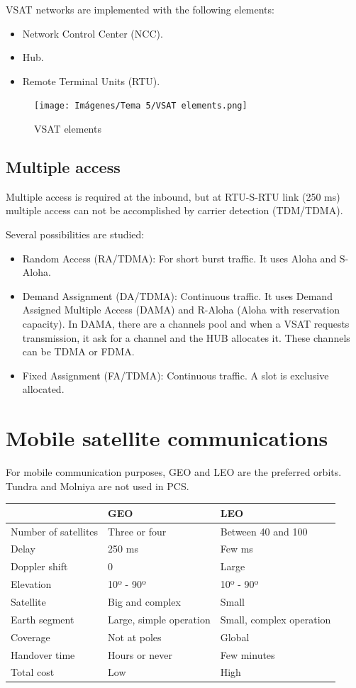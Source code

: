 \documentclass[
	12pt,
	twoside
]{book}
\begin{document}
VSAT networks are implemented with the following elements:
\begin{itemize}
	\item Network Control Center (NCC).
	\item Hub.
	\item Remote Terminal Units (RTU).
\end{itemize}

\begin{figure}[H]
	\centering
	\texttt{[image: Imágenes/Tema 5/VSAT elements.png]}
	\caption{
		\label{fig:unit5_VSAT}
		VSAT elements
	}
\end{figure}

\subsection{Multiple access}

Multiple access is required at the inbound, but at RTU-S-RTU link (250 ms) multiple access can not be accomplished by carrier detection (TDM/TDMA).

Several possibilities are studied:
\begin{itemize}
	\item Random Access (RA/TDMA): For short burst traffic. It uses Aloha and S-Aloha.
	\item Demand Assignment (DA/TDMA): Continuous traffic. It uses Demand Assigned Multiple Access (DAMA) and R-Aloha (Aloha with reservation capacity). In DAMA, there are a channels pool and when a VSAT requests transmission, it ask for a channel and the HUB allocates it. These channels can be TDMA or FDMA.
	\item Fixed Assignment (FA/TDMA): Continuous traffic. A slot is exclusive allocated.
\end{itemize}

\section{Mobile satellite communications}

For mobile communication purposes, GEO and LEO are the preferred orbits. Tundra and Molniya are not used in PCS.

\begin{tabular}{|l|l|l|}
	\hline
							& GEO						& LEO \\
	\hline
	Number of satellites	& Three or four				& Between 40 and 100 \\
	\hline
	Delay					& 250 ms					& Few ms \\
	\hline
	Doppler shift			& 0							& Large \\
	\hline
	Elevation				& 10º - 90º					& 10º - 90º \\
	\hline
	Satellite				& Big and complex			& Small \\
	\hline
	Earth segment			& Large, simple operation	& Small, complex operation \\
	\hline
	Coverage				& Not at poles				& Global \\
	\hline
	Handover time			& Hours or never			& Few minutes \\
	\hline
	Total cost				& Low						& High \\
	\hline
\end{tabular}
\end{document}
